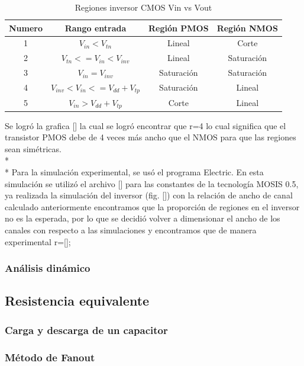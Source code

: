 \documentclass[12pt,a4paper]{article} %
\begin{document}
\begin{table}\label{table:Tabla_polarizacion}
\begin{center}
\begin{tabular}{c||c||c||c}
Numero & Rango entrada & Región PMOS & Región NMOS\\
\hline
\hline
1 & $V_{in}<V_{tn}$ & Lineal & Corte \\
2 & $V_{tn}<=V_{in}<V_{inv}$ & Lineal & Saturación \\
3 & $V_{in}=V_{inv}$ & Saturación & Saturación\\
4 & $V_{inv}<V_{in}<=V_{dd}+V_{tp}$ & Saturación & Lineal\\
5 & $V_{in}>V_{dd}+V_{tp}$ & Corte & Lineal\\
\hline
\end{tabular}
\caption{Regiones inversor CMOS Vin vs Vout}
\end{center}
\end{table}

Se logró la grafica [] la cual se logró encontrar que r=4 lo cual significa que el transistor PMOS debe de 4 veces más ancho que el NMOS para que las regiones sean simétricas.\\*
\\*
Para la simulación experimental, se usó el programa Electric. En esta simulación se utilizó el archivo [] para las constantes de la tecnología MOSIS 0.5, ya realizada la simulación del inversor (fig. []) con la relación de ancho de canal calculado anteriormente encontramos que la proporción de regiones en el inversor no es la esperada, por lo que se decidió volver a dimensionar el ancho de los canales con respecto a las simulaciones y encontramos que de manera experimental r=[]; 


\subsubsection{Análisis dinámico}



\subsection{Resistencia equivalente}

\subsubsection{Carga y descarga de un capacitor}


\subsubsection{Método de Fanout}
\end{document}
